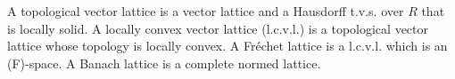 A topological vector lattice is a vector lattice and a Hausdorff t.v.s. over $R$ that is locally solid. A locally convex vector lattice (l.c.v.l.) is a topological vector lattice whose topology is locally convex. A Fr\'echet lattice is a l.c.v.l. which is an (F)-space. A Banach lattice is a complete normed lattice.
